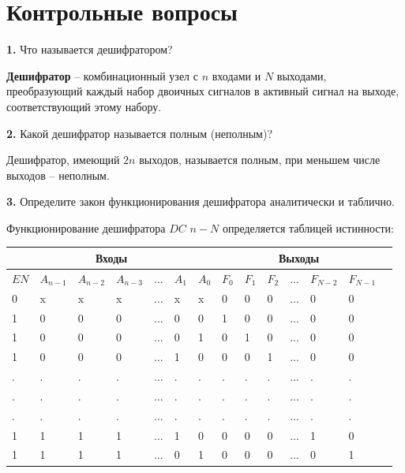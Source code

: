 \documentclass[a4paper,12pt]{article}
\begin{document}
\section{Контрольные вопросы}

\noindent\textbf{1.} Что называется дешифратором?\newline

\noindent\textbf{Дешифратор} -- комбинационный узел с $n$ входами и $N$ выходами, преобразующий каждый набор двоичных сигналов в активный сигнал на выходе, соответствующий этому набору.\newline

\noindent\textbf{2.} Какой дешифратор называется полным (неполным)? \newline

\noindent Дешифратор, имеющий $2n$ выходов, называется полным, при меньшем числе выходов -- неполным.
\newline

\noindent\textbf{3.} Определите закон функционирования дешифратора аналитически и таблично.\newline

\noindent Функционирование дешифратора $DC$ $n-N$ определяется таблицей истинности:

\begin{center}
	\begin{tabular}{ | l | l | l | l | l | l | l | l | l | l | l | l | l | p{1cm} |}
			\hline
			 \multicolumn{7}{|c|}{Входы} &  \multicolumn{6}{|c|}{Выходы} \\ \hline
			$EN$ & $A_{n - 1}$ & $A_{n - 2}$ & $A_{n - 3}$ & ... & $A_{1}$ & $A_{0} $ & $F_{0} $ & $F_{1}$ & $F_{2}$ & ... & $F_{N - 2}$ & $F_{N - 1}$ \\ \hline
			
			0 & x & x & x & ... & x & x & 0 & 0 & 0 & ... & 0 & 0 \\ \hline
			1 & 0 & 0 & 0 & ... & 0 & 0 & 1 & 0 & 0 & ... & 0 & 0 \\ \hline
			1 & 0 & 0 & 0 & ... & 0 & 1 & 0 & 1 & 0 & ... & 0 & 0 \\ \hline
			1 & 0 & 0 & 0 & ... & 1 & 0 & 0 & 0 & 1 & ... & 0 & 0 \\ \hline
			
			. & . & . & . & ... & . & . & . & . & . & ... & . & . \\ \hline
			. & . & . & . & ... & . & . & . & . & . & ... & . & . \\ \hline
			. & . & . & . & ... & . & . & . & . & . & ... & . & . \\ \hline
			
			1 & 1 & 1 & 1 & ... & 1 & 0 & 0 & 0 & 0 & ... & 1 & 0 \\ \hline
			1 & 1 & 1 & 1 & ... & 0 & 1 & 0 & 0 & 0 & ... & 0 & 1 \\ 
			\hline
	\end{tabular}
\end{center}
\end{document}
